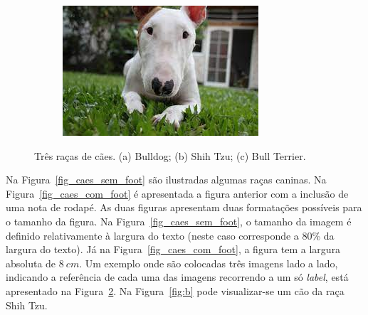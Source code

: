 \begin{figure}[htp]
\begin{subfigure}[b]{0.3\textwidth}
             \includegraphics[width=\textwidth]{Figuras/bull_terrier}
             \caption{}
             \label{fig:c}
         \end{subfigure}
            \caption{\small Três raças de cães. (a) Bulldog; (b) Shih Tzu; (c) Bull Terrier.}
            \label{fig_c}
    \end{figure}
    
    Na Figura~\ref{fig_caes_sem_foot} são ilustradas algumas raças caninas. Na Figura~\ref{fig_caes_com_foot} é apresentada a figura anterior com a inclusão de uma nota de rodapé. As duas figuras apresentam duas formatações possíveis para o tamanho da figura. Na Figura~\ref{fig_caes_sem_foot}, o tamanho da imagem é definido relativamente à largura do texto (neste caso corresponde a 80\% da largura do texto). Já na Figura~\ref{fig_caes_com_foot}, a figura tem a largura absoluta de $8~cm$.   
    Um exemplo onde são colocadas três imagens lado a lado, indicando a referência de cada uma das imagens recorrendo a um só  \textit{label}, está apresentado na Figura~\ref{fig_c}. Na Figura~\ref{fig:b} pode visualizar-se um cão da raça Shih Tzu.
    
    
    